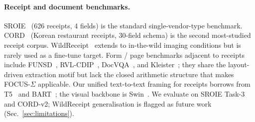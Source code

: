 \paragraph{Receipt and document benchmarks.}
SROIE~\cite{huang2019icdar} (626 receipts, 4 fields) is the standard
single-vendor-type benchmark.  CORD~\cite{park2019cord} (Korean
restaurant receipts, 30-field schema) is the second most-studied
receipt corpus.  WildReceipt~\cite{sun2021wildreceipt} extends to
in-the-wild imaging conditions but is rarely used as a fine-tune
target.  Form / page benchmarks adjacent to receipts include
FUNSD~\cite{jaume2019funsd}, RVL-CDIP~\cite{harley2015rvlcdip},
DocVQA~\cite{mathew2021docvqa}, and Kleister~\cite{stanislawek2021kleister};
they share the layout-driven extraction motif but lack the closed
arithmetic structure that makes FOCUS-$\Sigma$ applicable.  Our
unified text-to-text framing for receipts borrows from
T5~\cite{raffel2020t5} and BART~\cite{lewis2020bart}; the visual
backbone is Swin~\cite{liu2021swin}.  We evaluate on SROIE Task-3 and
CORD-v2; WildReceipt generalisation is flagged as future work
(Sec.~\ref{sec:limitations}).
